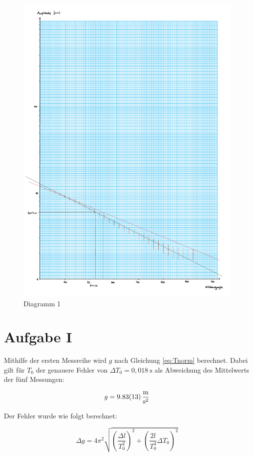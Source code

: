 \begin{figure}[h!]
    \centering
    \includegraphics[width = .95 \textwidth]{Dia14.pdf}
    \caption{Diagramm 1}
\end{figure}


\section{Aufgabe I}

Mithilfe der ersten Messreihe wird $g$ nach Gleichung \ref{eq:Tnorm} berechnet.
Dabei gilt für $T_0$ der genauere Fehler von $\Delta T_0 = 0,018\ \text{s}$ als Abweichung des Mittelwerts der fünf Messungen:

\[g =\SI{9,83 \pm 0,13 }{\frac{\meter}{\second^2}}\]

Der Fehler wurde wie folgt berechnet:

\begin{equation}
    \Delta g = 4\pi^2 \sqrt{\left(\frac{\Delta l}{T_0^2}\right)^2 + \left(\frac{2l}{T_0^3}\Delta T_0\right)^2}
\end{equation}

